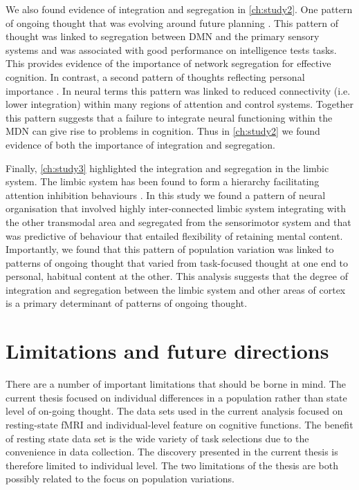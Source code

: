 We also found evidence of integration and segregation in \cref{ch:study2}. One pattern of ongoing thought that was evolving around future planning . This pattern of thought was linked to segregation between DMN and the primary sensory systems and was associated with good performance on intelligence tests tasks. This provides evidence of the importance of network segregation for effective cognition. In contrast, a second pattern of thoughts reflecting personal importance . In neural terms this pattern was linked to reduced connectivity (i.e. lower integration) within many regions of attention and control systems. Together this pattern suggests that a failure to integrate neural functioning within the MDN can give rise to problems in cognition. Thus in \cref{ch:study2} we found evidence of both the importance of integration and segregation. 

Finally, \cref{ch:study3} highlighted the integration and segregation in the limbic system. The limbic system has been found to form a hierarchy facilitating attention inhibition behaviours \cite{Kleckner2017}. In this study we found a pattern of neural organisation that involved highly inter-connected limbic system integrating with the other transmodal area and segregated from the sensorimotor system and that was predictive of behaviour that entailed flexibility of retaining mental content. Importantly, we found that this pattern of population variation was linked to patterns of ongoing thought that varied from task-focused thought at one end to personal, habitual content at the other. This analysis suggests that the degree of integration and segregation between the limbic system and other areas of cortex is a primary determinant of patterns of ongoing thought.


\section{Limitations and future directions}

There are a number of important limitations that should be borne in mind. The current thesis focused on individual differences in a population rather than state level of on-going thought. The data sets used in the current analysis focused on resting-state fMRI and individual-level feature on cognitive functions. The benefit of resting state data set is the wide variety of task selections due to the convenience in data collection. The discovery presented in the current thesis is therefore limited to individual level. The two limitations of the thesis are both possibly related to the focus on population variations. 

